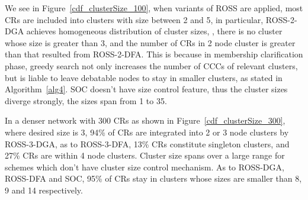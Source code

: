 
We see in Figure~\ref{cdf_clusterSize_100}, when variants of ROSS are applied, most CRs are included into clusters with size between 2 and 5, in particular, ROSS-2-DGA achieves homogeneous distribution of cluster sizes, \ie, there is no cluster whose size is greater than 3, and the number of CRs in 2 node cluster is greater than that resulted from ROSS-2-DFA.
This is because in membership clarification phase, greedy search not only increases the number of CCCs of relevant clusters, but is liable to leave debatable nodes to stay in smaller clusters, as stated in Algorithm~\ref{alg4}.
SOC doesn't have size control feature, thus the cluster sizes diverge strongly, \ie the sizes span from 1 to 35.

In a denser network with 300 CRs as shown in Figure~\ref{cdf_clusterSize_300}, where desired size is 3, 94\% of CRs are integrated into 2 or 3 node clusters by ROSS-3-DGA, as to ROSS-3-DFA, 13\% CRs constitute singleton clusters, and 27\% CRs are within 4 node clusters.
Cluster size spans over a large range for schemes which don't have cluster size control mechanism.
As to ROSS-DGA, ROSS-DFA and SOC, 95\% of CRs stay in clusters whose sizes are smaller than 8, 9 and 14 respectively.



